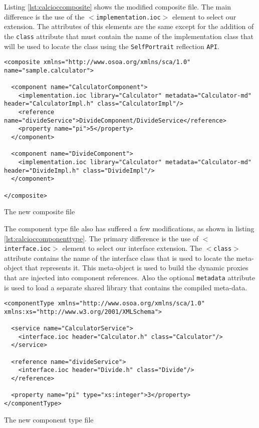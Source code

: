 Listing \ref{lst:calcioccomposite} shows the modified composite file. The main difference
is the use of the \texttt{$<$implementation.ioc$>$} element to select our extension. The attributes
of this elements are the same except for the addition of the \texttt{class} attribute that must
contain the name of the implementation class that will be used to locate the class using the
\texttt{SelfPortrait} reflection \texttt{API}.

\begin{listing}
\begin{verbatim}
<composite xmlns="http://www.osoa.org/xmlns/sca/1.0" name="sample.calculator">

  <component name="CalculatorComponent">
    <implementation.ioc library="Calculator" metadata="Calculator-md" header="CalculatorImpl.h" class="CalculatorImpl"/>
    <reference name="divideService">DivideComponent/DivideService</reference>
    <property name="pi">5</property>
  </component>
        
  <component name="DivideComponent">
    <implementation.ioc library="Calculator" metadata="Calculator-md" header="DivideImpl.h" class="DivideImpl"/>
  </component>

</composite>
\end{verbatim}
\caption{The new composite file}
\label{lst:calcioccomposite}
\end{listing}

The component type file also has suffered a few modifications, as shown in listing \ref{lst:calcioccomponenttype}.
The primary difference is the use of \texttt{$<$interface.ioc$>$} element to select our interface extension.
The \texttt{$<$class$>$} attribute contains the name of the interface class that is used to locate the
meta-object that represents it. This meta-object is used to build the dynamic proxies that are injected into
component references. Also the optional \texttt{metadata} attribute is used to load a separate shared library
that contains the compiled meta-data.

\begin{listing}
\begin{verbatim}
<componentType xmlns="http://www.osoa.org/xmlns/sca/1.0" xmlns:xs="http://www.w3.org/2001/XMLSchema">

  <service name="CalculatorService">
    <interface.ioc header="Calculator.h" class="Calculator"/>
  </service>

  <reference name="divideService">
    <interface.ioc header="Divide.h" class="Divide"/>
  </reference>
  
  <property name="pi" type="xs:integer">3</property>
</componentType>
\end{verbatim}
\caption{The new component type file}
\label{lst:calcioccomponenttype}
\end{listing}

